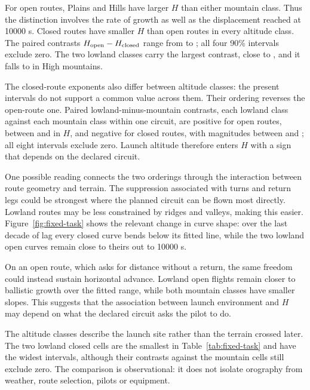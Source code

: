 For open routes, Plains and Hills have larger $H$ than either mountain class. Thus
the distinction involves the rate of growth as well as the displacement reached at
10000 s. Closed routes have smaller $H$ than open routes in every altitude class.
The paired contrasts $H_{\rm open}-H_{\rm closed}$ range from \ChThreeTaskContrastMin{}
to \ChThreeTaskContrastMax; all four 90\% intervals exclude zero. The two lowland
classes carry the largest contrast, close to \ChThreeTaskContrastMax, and it falls to
\ChThreeTaskContrastMin{} in High mountains.

The closed-route exponents also differ between altitude classes: the present intervals
do not support a common value across them. Their ordering reverses the open-route one.
Paired lowland-minus-mountain contrasts, each lowland class against each mountain class
within one circuit, are positive for open routes, between \ChThreeOpenAltShiftMin{} and
\ChThreeOpenAltShiftMax{} in $H$, and negative for closed routes, with magnitudes between
\ChThreeClosedAltShiftMin{} and \ChThreeClosedAltShiftMax; all eight intervals exclude
zero. Launch altitude therefore enters $H$ with a sign that depends on the declared
circuit.

One possible reading connects the two orderings through the interaction between
route geometry and terrain. The suppression associated with turns and return
legs could be strongest where the planned circuit can be flown most directly.
Lowland routes may be less constrained by ridges and valleys, making this easier.
Figure~\ref{fig:fixed-task} shows the relevant change in curve shape: over the last
decade of lag every closed curve bends below its fitted line, while the two
lowland open curves remain close to theirs out to 10000 s.

On an open route, which asks for distance without a return, the same freedom
could instead sustain horizontal advance. Lowland open flights remain closer to
ballistic growth over the fitted range, while both mountain classes have smaller
slopes. This suggests that the association between launch environment and $H$
may depend on what the declared circuit asks the pilot to do.

The altitude classes describe the launch site rather than the terrain crossed
later. The two lowland closed cells are the smallest in
Table~\ref{tab:fixed-task} and have the widest intervals, although their contrasts
against the mountain cells still exclude zero. The comparison is observational: it
does not isolate orography from weather, route selection, pilots or equipment.

